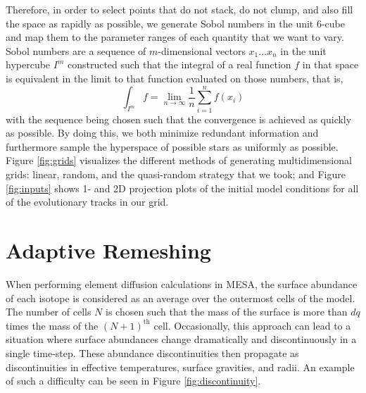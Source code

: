 \documentclass[manuscript]{aastex}
\begin{document}
Therefore, in order to select points that do not stack, do not clump, and also fill the space as rapidly as possible, we generate Sobol numbers \citep{sobol1967distribution} in the unit 6-cube and map them to the parameter ranges of each quantity that we want to vary. Sobol numbers are a sequence of $m$-dimensional vectors $x_1 \ldots x_n$ in the unit hypercube $I^m$ constructed such that the integral of a real function $f$ in that space is equivalent in the limit to that function evaluated on those numbers, that is,
\begin{equation}
    \int_{I^m} f = \lim_{n \to \infty} \frac{1}{n}\sum_{i=1}^n f(x_i)
\end{equation}
with the sequence being chosen such that the convergence is achieved as quickly as possible. By doing this, we both minimize redundant information and furthermore sample the hyperspace of possible stars as uniformly as possible. Figure \ref{fig:grids} visualizes the different methods of generating multidimensional grids: linear, random, and the quasi-random strategy that we took; and Figure \ref{fig:inputs} shows 1- and 2D projection plots of the initial model conditions for all of the evolutionary tracks in our grid. 

\begin{figure*}
    \centering
    \caption{Results of different methods for generating multidimensional grids portrayed via a unit cube projected onto a unit square. Linear (left), random (middle), and quasi-random (right) grids are generated in three dimensions, with color depicting the third dimension, i.e., the distance between the reader and the screen. From top to bottom, all three methods are shown with 100, 400, and 2000 points generated, respectively. }%
    \label{fig:grids}
\end{figure*}


\section{Adaptive Remeshing}
\label{sec:remeshing}

When performing element diffusion calculations in MESA, the surface abundance of each isotope is considered as an average over the outermost cells of the model. The number of cells $N$ is chosen such that the mass of the surface is more than $dq$ times the mass of the $(N+1)^{\text{th}}$ cell. Occasionally, this approach can lead to a situation where surface abundances change dramatically and discontinuously in a single time-step. These abundance discontinuities then propagate as discontinuities in effective temperatures, surface gravities, and radii. An example of such a difficulty can be seen in Figure \ref{fig:discontinuity}. 
\end{document}
